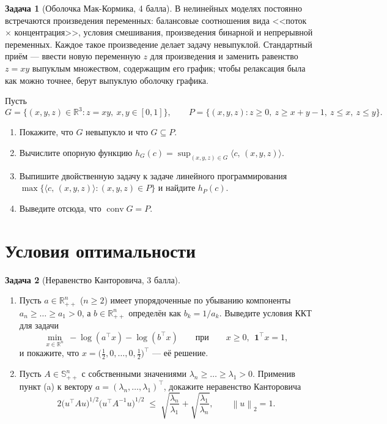 \documentclass[11pt]{article}
\theoremstyle{definition}
\newtheorem{problem}{Задача}
\theoremstyle{starred}
\theoremstyle{definition}
\theoremstyle{remark}
\theoremstyle{plain}
\theoremstyle{definition}
\DeclareMathOperator{\conv}{conv}
\newcommand{\R}{\mathbb{R}}
\newcommand{\Sym}{\mathbb{S}}
\newcommand{\norm}[1]{\left\lVert #1 \right\rVert}
\newcommand{\iprod}[2]{\langle #1,\, #2 \rangle}
\newcommand{\ones}{\mathbf{1}}
\begin{document}
\begin{problem}[Оболочка Мак-Кормика, 4 балла]
В нелинейных моделях постоянно встречаются произведения переменных: балансовые соотношения вида
<<поток $\times$ концентрация>>, условия смешивания, произведения бинарной и непрерывной
переменных. Каждое такое произведение делает задачу невыпуклой. Стандартный приём --- ввести новую
переменную $z$ для произведения и заменить равенство $z = xy$ выпуклым множеством, содержащим его
график; чтобы релаксация была как можно точнее, берут выпуклую оболочку графика.

Пусть
\[
G = \{(x,y,z) \in \R^{3} : z = xy,\ x, y \in [0,1]\},
\qquad
P = \{(x,y,z) : z \ge 0,\ z \ge x{+}y{-}1,\ z \le x,\ z \le y\}.
\]
\begin{enumerate}[label=(\alph*), nosep]
  \item Покажите, что $G$ невыпукло и что $G \subseteq P$.
  \item Вычислите опорную функцию $h_G(c) = \sup_{(x,y,z) \in G} \iprod{c}{(x,y,z)}$.
  \item Выпишите двойственную задачу к задаче линейного программирования
        $\max\{\iprod{c}{(x,y,z)} : (x,y,z) \in P\}$ и найдите $h_P(c)$.
  \item Выведите отсюда, что $\conv G = P$.
\end{enumerate}
\end{problem}

\section{Условия оптимальности}

\begin{problem}[Неравенство Канторовича, 3 балла]
\begin{enumerate}[label=(\alph*), nosep]
  \item Пусть $a \in \R^{n}_{++}$ ($n\geq 2$) имеет упорядоченные по убыванию компоненты
        $a_n \ge \dots \ge a_1 > 0$, а $b \in \R^{n}_{++}$ определён как $b_k = 1/a_k$. Выведите
        условия ККТ для задачи
        \[
        \min_{x \in \R^{n}} \ -\log(a^{\top}x) - \log(b^{\top}x)
        \qquad\text{при}\qquad x \ge 0,\ \ \ones^{\top} x = 1,
        \]
        и покажите, что $x = \bigl(\tfrac12, 0, \dots, 0, \tfrac12\bigr)^{\top}$ --- её решение.
  \item Пусть $A \in \Sym^{n}_{++}$ с собственными значениями
        $\lambda_n \ge \dots \ge \lambda_1 > 0$. Применив пункт (a) к вектору
        $a = (\lambda_n, \dots, \lambda_1)^{\top}$, докажите неравенство Канторовича
        \[
        2\bigl(u^{\top} A u\bigr)^{1/2}\bigl(u^{\top} A^{-1} u\bigr)^{1/2}
        \;\le\; \sqrt{\frac{\lambda_n}{\lambda_1}} + \sqrt{\frac{\lambda_1}{\lambda_n}},
        \qquad \norm{u}_2 = 1 .
        \]
\end{enumerate}
\end{problem}
\end{document}
